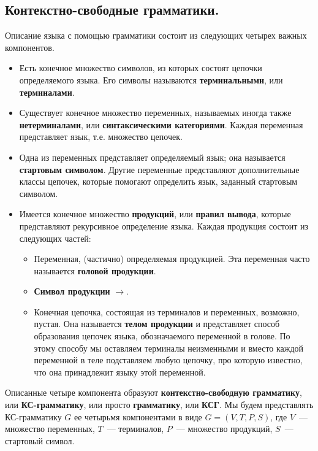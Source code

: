 \documentclass[a4paper,12pt]{article}
\begin{document}
	\subsection{Контекстно-свободные грамматики.}
	Описание языка с помощью грамматики состоит из следующих четырех важных компонентов.
	\begin{itemize}
		\item Есть конечное множество символов, из которых состоят цепочки определяемого языка. Его символы называются \textbf{терминальными}, или \textbf{терминалами}.
		
		\item Существует конечное множество переменных, называемых иногда также \textbf{нетерминалами}, или \textbf{синтаксическими категориями}. Каждая переменная представляет язык, т.е. множество цепочек.
		
		\item Одна из переменных представляет определяемый язык; она называется \textbf{стартовым символом}. Другие переменные представляют дополнительные классы цепочек, которые помогают определить язык, заданный стартовым символом.
		
		\item Имеется конечное множество \textbf{продукций}, или \textbf{правил вывода}, которые представляют рекурсивное определение языка. Каждая продукция состоит из следующих частей:
		\begin{itemize}
			\item Переменная, (частично) определяемая продукцией. Эта переменная часто называется \textbf{головой продукции}.
			\item \textbf{Символ продукции} $\to$.
			\item Конечная цепочка, состоящая из терминалов и переменных, возможно, пустая. Она называется \textbf{телом продукции} и представляет способ образования цепочек языка, обозначаемого переменной в голове. По этому способу мы оставляем терминалы неизменными и вместо каждой переменной в теле подставляем любую цепочку, про которую известно, что она принадлежит языку этой переменной.
		\end{itemize}
	\end{itemize}
	Описанные четыре компонента образуют \textbf{контекстно-свободную грамматику}, или \textbf{КС-грамматику}, или просто \textbf{грамматику}, или \textbf{КСГ}. Мы будем представлять КС-грамматику $G$ ее четырьмя компонентами в виде $G = (V, T, P, S)$, где $V$~--- множество переменных, $T$~--- терминалов, $P$~--- множество продукций, $S$~--- стартовый символ.
	
\end{document}

